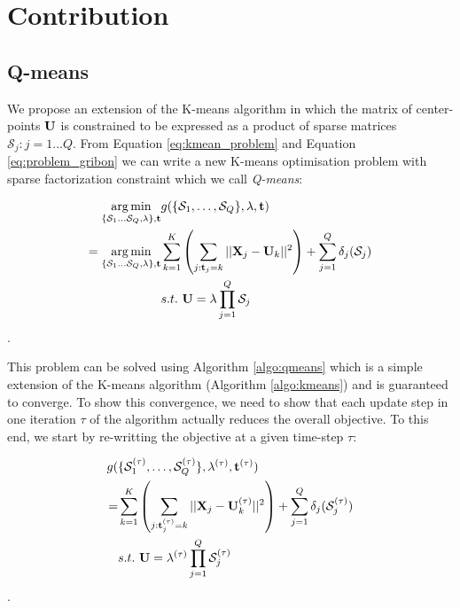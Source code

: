 \section{Contribution}
\label{sec:contribution}
\subsection{Q-means}

We propose an extension of the K-means algorithm in which the matrix of center-points ${\mathbf{U}}$ is constrained to be expressed as a product of sparse matrices $\mathcal{S}_j: j = 1 \ldots Q$. From Equation \ref{eq:kmean_problem} and Equation \ref{eq:problem_gribon} we can write a new K-means optimisation problem with sparse factorization constraint which we call \textit{Q-means}:

\begin{equation}
\begin{split}
\label{eq:qmean_problem}
 \operatorname*{arg\,min}_{\{\mathcal{S}_1 \dots \mathcal{S}_Q, \lambda\}, {\mathbf{t}}} & g(\{ \mathcal{S}_1, \ldots,\mathcal{S}_Q \}, \lambda, {\mathbf{t}})\\
    =\operatorname*{arg\,min}_{\{\mathcal{S}_1 \dots \mathcal{S}_Q, \lambda\}, {\mathbf{t}}} & \sum_{k=1}^{K} \left( \sum_{j: {\mathbf{t}}_j = k} ||{\mathbf{X}}_j -{\mathbf{U}}_k||^2 \right) + \sum_{j=1}^{Q} \delta_j(\mathcal{S}_j) \\
    & s.t. ~ {\mathbf{U}} = \lambda \prod_{j=1}^{Q}{\mathcal{S}_j}
\end{split}
\end{equation}.

This problem can be solved using Algorithm \ref{algo:qmeans} which is a simple extension of the K-means algorithm (Algorithm \ref{algo:kmeans}) and is guaranteed to converge. To show this convergence, we need to show that each update step in one iteration $\tau$ of the algorithm actually reduces the overall objective. To this end, we start by re-writting the objective at a given time-step $\tau$:

\begin{equation}
\begin{split}
\label{eq:qmean_problem_2}
    g(&\{ \mathcal{S}_1^{(\tau)}, \ldots,\mathcal{S}_Q^{(\tau)} \}, \lambda^{(\tau)}, {\mathbf{t}}^{(\tau)})\\
    = & \sum_{k=1}^{K} \left( \sum_{j: {\mathbf{t}}^{(\tau)}_j = k} ||{\mathbf{X}}_j - {\mathbf{U}}^{(\tau)}_k||^2 \right) + \sum_{j=1}^{Q} \delta_j(\mathcal{S}_j^{(\tau)})\\
    & s.t. ~ {\mathbf{U}} = \lambda^{(\tau)} \prod_{j=1}^{Q}{\mathcal{S}_j^{(\tau)}}
\end{split}
\end{equation}.

